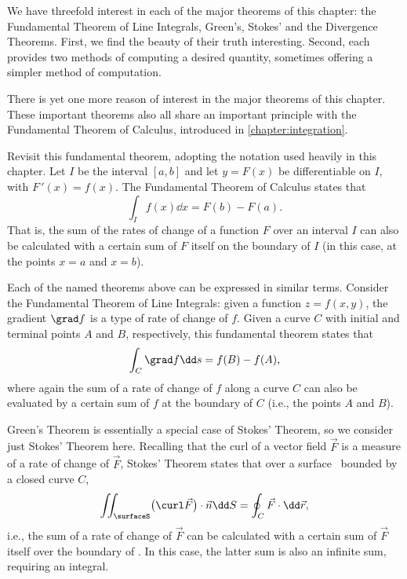 We have threefold interest in each of the major theorems of this chapter: the Fundamental Theorem of Line Integrals, Green's, Stokes' and the Divergence Theorems. First, we find the beauty of their truth interesting. Second, each provides two methods of computing a desired quantity, sometimes offering a simpler method of computation. 


There is yet one more reason of interest in the major theorems of this chapter. %
These important theorems also all share an important principle with the Fundamental Theorem of Calculus, introduced in \autoref{chapter:integration}. 

Revisit this fundamental theorem, adopting the notation used heavily in this chapter. Let $I$ be the interval $[a,b]$ and let $y=F(x)$ be differentiable on $I$, with $F\,'(x) = f(x)$. The Fundamental Theorem of Calculus states that 
\[\int_I f(x)\dd x = F(b) - F(a).\]
That is, the sum of the rates of change of a function $F$ over an interval $I$ can also be calculated with a certain sum of $F$ itself on the boundary of $I$ (in this case, at the points $x=a$ and $x=b$).

Each of the named theorems above can be expressed in similar terms. Consider the Fundamental Theorem of Line Integrals: given a function $z=f(x,y)$, the gradient $\grad f$ is a type of rate of change of $f$. Given a curve $C$ with initial and terminal points $A$ and $B$, respectively, this fundamental theorem states that 
\[\int_C \grad f\dd s = f(B) - f(A),\]
where again the sum of a rate of change of $f$ along a curve $C$ can also be evaluated by a certain sum of $f$ at the boundary of $C$ (i.e., the points $A$ and $B$).

Green's Theorem is essentially a special case of Stokes' Theorem, so we consider just Stokes' Theorem here. Recalling that the curl of a vector field $\vec F$ is a measure of a rate of change of $\vec F$, Stokes' Theorem states that over a surface \surfaceS\ bounded by a closed curve $C$,
\[
\iint_{\surfaceS} \bigl(\curl \vec F\bigr)\cdot \vec n\dd S = \oint_C \vec F\cdot\dd\vec r,
\]
i.e., the sum of a rate of change of $\vec F$ can be calculated with a certain sum of $\vec F$ itself over the boundary of \surfaceS. In this case, the latter sum is also an infinite sum, requiring an integral. 

